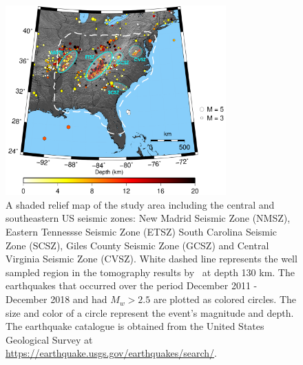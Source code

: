 \documentclass[draft,linenumbers]{agujournal2018}
\begin{document}
\begin{figure}[ht]
    \centering
    \includegraphics[width=20pc]{figures/seismicity_new.png}
    \caption{ A shaded relief map of the study area including the central and southeastern US seismic zones: New Madrid Seismic Zone (NMSZ), Eastern Tennessse Seismic Zone (ETSZ) South Carolina Seismic Zone (SCSZ), Giles County Seismic Zone (GCSZ) and Central Virginia Seismic Zone (CVSZ). White dashed line represents the well sampled region in the tomography results by~\citet{Biryol_2016} at depth 130 km. The earthquakes that occurred over the period December 2011 - December 2018 and had $M_{w} > 2.5$ are plotted as colored circles. The size and color of a circle represent the event's magnitude and depth. The earthquake catalogue is obtained from the United States Geological Survey at \url{https://earthquake.usgs.gov/earthquakes/search/}.}
    \label{figone}
 \end{figure}
   
    
\end{document}
